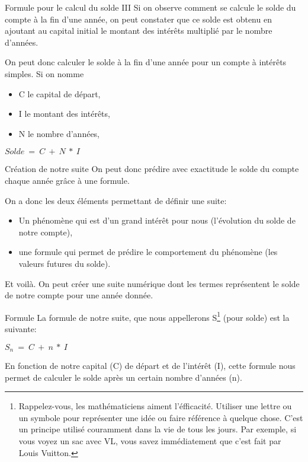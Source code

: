 \documentclass{beamer}
\begin{document}
\begin{frame}{Formule pour le calcul du solde III}
  Si on observe comment se calcule le solde du compte à la fin d'une année, on peut constater que ce solde est obtenu en ajoutant au capital initial le montant des intérêts multiplié par le nombre d'années.

  On peut donc calculer le solde à la fin d'une année pour un compte à intérêts simples. Si on nomme
  \begin{itemize}
    \item C le capital de départ,
    \item I le montant des intérêts,
    \item N le nombre d'années,
  \end{itemize}

\begin{center}
  \begin{math}
    Solde\ =\ C\ +\ N\ *\ I\
  \end{math}
\end{center}   
\end{frame}

\begin{frame}{Création de notre suite}
  On peut donc prédire avec exactitude le solde du compte chaque année grâce à une formule.
  
  On a donc les deux éléments permettant de définir une suite:
  \begin{itemize}
    \item Un phénomène qui est d'un grand intérêt pour nous (l'évolution du solde de notre compte),
    \item une formule qui permet de prédire le comportement du phénomène (les valeurs futures du solde).
  \end{itemize} 

  Et voilà. On peut créer une suite numérique dont les termes représentent le solde de notre compte pour une année donnée.
\end{frame}

\begin{frame}{Formule}
  La formule de notre suite, que nous appellerons S\footnote{Rappelez-vous, les mathématiciens aiment l'éfficacité. Utiliser une lettre ou un symbole pour représenter une idée ou faire référence à quelque chose. C'est un principe utilisé couramment dans la vie de tous les jours. Par exemple, si vous voyez un sac avec VL, vous savez immédiatement que c'est fait par Louis Vuitton. } (pour solde) est la suivante:
  \begin{center}
    \begin{math}
      S_{n}\ =\ C\ +\ n\ *\ I
    \end{math}
  \end{center}

En fonction de notre capital (C) de départ et de l'intérêt (I), cette formule nous permet de calculer le solde après un certain nombre d'années (n).
\end{frame}
\end{document}
